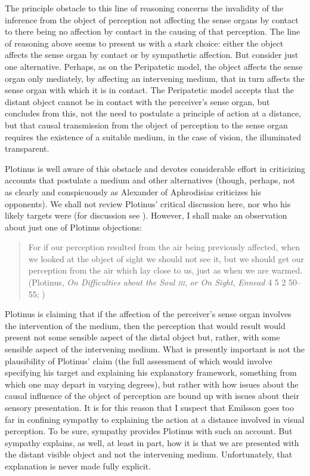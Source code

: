 The principle obstacle to this line of reasoning concerns the invalidity of the inference from the object of perception not affecting the sense organs by contact to there being no affection by contact in the causing of that perception. The line of reasoning above seems to present us with a stark choice: either the object affects the sense organ by contact or by sympathetic affection. But consider just one alternative. Perhaps, as on the Peripatetic model, the object affects the sense organ only mediately, by affecting an intervening medium, that in turn affects the sense organ with which it is in contact. The Peripatetic model accepts that the distant object cannot be in contact with the perceiver's sense organ, but concludes from this, not the need to postulate a principle of action at a distance, but that causal transmission from the object of perception to the sense organ requires the existence of a suitable medium, in the case of vision, the illuminated transparent.

Plotinus is well aware of this obstacle and devotes considerable effort in criticizing accounts that postulate a medium and other alternatives (though, perhaps, not as clearly and conspicuously as Alexander of Aphrodisias criticizes his opponents). We shall not review Plotinus' critical discussion here, nor who his likely targets were (for discussion see \citealt[chapter 3.1]{Emilsson:1988uq}). However, I shall make an observation about just one of Plotinus objections:
\begin{quote}
	For if our perception resulted from the air being previously affected, when we looked at the object of sight we should not see it, but we should get our perception from the air which lay close to us, just as when we are warmed. (Plotinus, \emph{On Difficulties about the Soul \textsc{iii}}, \emph{or On Sight}, \emph{Ennead} 4 5 2 50--55; \citealt[289]{Armstrong:1984aa})
\end{quote}
Plotinus is claiming that if the affection of the perceiver's sense organ involves the intervention of the medium, then the perception that would result would present not some sensible aspect of the distal object but, rather, with some sensible aspect of the intervening medium. What is presently important is not the plausibility of Plotinus' claim (the full assessment of which would involve specifying his target and explaining his explanatory framework, something from which one may depart in varying degrees), but rather with how issues about the causal influence of the object of perception are bound up with issues about their sensory presentation. It is for this reason that I suspect that Emilsson goes too far in confining sympathy to explaining the action at a distance involved in visual perception. To be sure, sympathy provides Plotinus with such an account. But sympathy explains, as well, at least in part, how it is that we are presented with the distant visible object and not the intervening medium. Unfortunately, that explanation is never made fully explicit.

